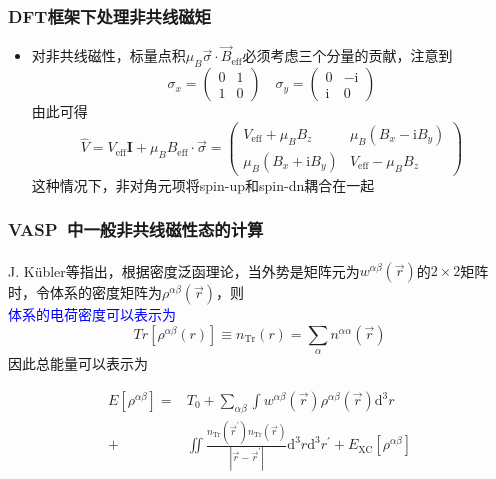 \documentclass[cjk,slidestop,compress,mathserif,blue]{beamer}
\newcommand{\upcite}[1]{\hspace{0ex}\textsuperscript{\cite{#1}}} %
\begin{document}
\frame
{
	\frametitle{\textrm{DFT}框架下处理非共线磁矩}
\begin{itemize}
	\item 对\textrm{非共线磁性}，标量点积$\mu_B\vec\sigma\cdot\vec B_{\mathrm{eff}}$必须考虑三个分量的贡献，注意到
\begin{displaymath}
	\sigma_x=\left(
	\begin{matrix}
		0 &1\\
		1 &0
	\end{matrix}\right)\quad
	\sigma_y=\left(
	\begin{matrix}
		0 &-\mathrm{i}\\
		\mathrm{i} &0
	\end{matrix}\right)
\end{displaymath}
由此可得
		\begin{displaymath}
			\hat V=V_{\mathrm{eff}}\mathbf{I}+\mu_BB_{\mathrm{eff}}\cdot\vec\sigma=\left(
			\begin{matrix}
				V_{\mathrm{eff}}+\mu_BB_z &\mu_B(B_x-\mathrm{i}B_y)\\
				\mu_B(B_x+\mathrm{i}B_y) &V_{\mathrm{eff}}-\mu_BB_z
			\end{matrix}\right)
		\end{displaymath}
		这种情况下，非对角元项将\textrm{spin-up}和\textrm{spin-dn}耦合在一起

\end{itemize}
}

\frame
{
	\frametitle{\textrm{VASP~}中一般非共线磁性态的计算}
	\textrm{J. K\"ubler}等指出\upcite{JAP63-3482_1988}，根据密度泛函理论，当外势是矩阵元为$w^{\alpha\beta}(\vec r)$的$2\times2$矩阵时，令体系的密度矩阵为$\rho^{\alpha\beta}(\vec r)$，则\\
	\textcolor{blue}{体系的电荷密度可以表示为}
	\begin{displaymath}
		Tr[\rho^{\alpha\beta}(r)]\equiv n_{\mathrm{Tr}}(r)=\sum_{\alpha}n^{\alpha\alpha}(\vec r)
	\end{displaymath}
	因此总能量可以表示为
	
	\begin{displaymath}
		\begin{aligned}
			E[\rho^{\alpha\beta}]=&T_0+\sum_{\alpha\beta}\int w^{\alpha\beta}(\vec r)\rho^{\alpha\beta}(\vec r)\mathrm{d}^3r\\
			+&\iint\frac{n_{\mathrm{Tr}}(\vec r^{\prime})n_{\mathrm{Tr}}(\vec r)}{|\vec r-\vec r^{\prime}|}\mathrm{d}^3r\mathrm{d}^3r^{\prime}+E_{\mathrm{XC}}[\rho^{\alpha\beta}]
		\end{aligned}
	\end{displaymath}
}
\end{document}

